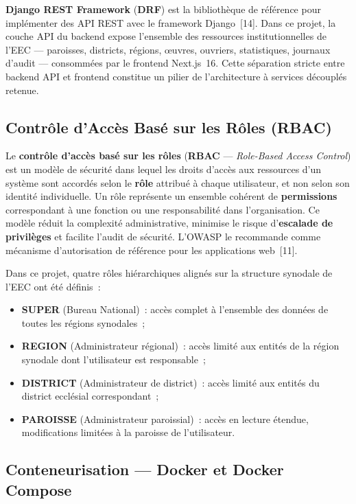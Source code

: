 \documentclass[12pt, a4paper]{report}
\newcommand{\kw}[1]{\textbf{#1}}
\begin{document}
\kw{Django REST Framework} (\kw{DRF}) est la bibliothèque de référence pour
implémenter des API REST avec le framework Django~[14]. Dans ce projet, la couche
API du backend expose l'ensemble des ressources institutionnelles de l'EEC ---
paroisses, districts, régions, œuvres, ouvriers, statistiques, journaux d'audit
--- consommées par le frontend Next.js~16. Cette séparation stricte entre backend
API et frontend constitue un pilier de l'architecture à services découplés retenue.

\subsection{Contrôle d'Accès Basé sur les Rôles (RBAC)}

Le \kw{contrôle d'accès basé sur les rôles} (\kw{RBAC} --- \textit{Role-Based
Access Control}) est un modèle de sécurité dans lequel les droits d'accès aux
ressources d'un système sont accordés selon le \textbf{rôle} attribué à chaque
utilisateur, et non selon son identité individuelle. Un rôle représente un
ensemble cohérent de \textbf{permissions} correspondant à une fonction ou une
responsabilité dans l'organisation. Ce modèle réduit la complexité
administrative, minimise le risque d'\textbf{escalade de privilèges} et facilite
l'audit de sécurité. L'OWASP le recommande comme mécanisme d'autorisation de
référence pour les applications web~[11].

Dans ce projet, quatre rôles hiérarchiques alignés sur la structure synodale de
l'EEC ont été définis~:
\begin{itemize}[itemsep=2pt, topsep=4pt, leftmargin=1.5cm]
  \item \textbf{SUPER} (Bureau National)~: accès complet à l'ensemble des données
    de toutes les régions synodales~;
  \item \textbf{REGION} (Administrateur régional)~: accès limité aux entités de
    la région synodale dont l'utilisateur est responsable~;
  \item \textbf{DISTRICT} (Administrateur de district)~: accès limité aux entités
    du district ecclésial correspondant~;
  \item \textbf{PAROISSE} (Administrateur paroissial)~: accès en lecture étendue,
    modifications limitées à la paroisse de l'utilisateur.
\end{itemize}

\subsection{Conteneurisation --- Docker et Docker Compose}
\end{document}
